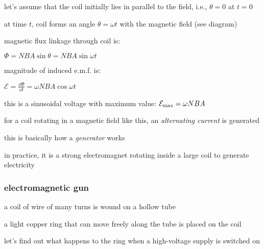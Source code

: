 let's assume that the coil initially lies in parallel to the field, i.e., $\theta=0$ at $t=0$

at time $t$, coil forms an angle $\theta=\omega t$ with the magnetic field (see diagram)

magnetic flux linkage through coil is:

{

\centering

$\Phi = NBA \sin\theta = NBA \sin \omega t$

}

magnitude of induced e.m.f. is: 

{
	
\centering

$\mathcal{E} = \frac{\dd \Phi}{\dd t} = \omega NBA \cos \omega t$

}

this is a sinusoidal voltage with maximum value: $\mathcal{E}_{\text{max}} = \omega NBA$

for a coil rotating in a magnetic field like this, an \emph{alternating current} is generated

this is basically how a \emph{generator} works

in practice, it is a strong electromagnet rotating inside a large coil to generate electricity




\subsubsection{electromagnetic gun}

a coil of wire of many turns is wound on a hollow tube

a light copper ring that can move freely along the tube is placed on the coil

let's find out what happens to the ring when a high-voltage supply is switched on


